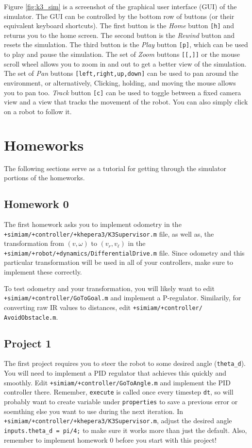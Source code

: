 \documentclass[10pt]{article}
\begin{document}
Figure \ref{fig:k3_sim} is a screenshot of the graphical user interface (GUI) of the simulator. The GUI can be controlled by the bottom row of buttons (or their equivalent keyboard shortcuts). The first button is the \textit{Home} button \texttt{[h]} and returns you to the home screen. The second button is the \textit{Rewind} button and resets the simulation. The third button is the \textit{Play} button \texttt{[p]}, which can be used to play and pause the simulation. The set of \textit{Zoom} buttons \texttt{[[,]]} or the mouse scroll wheel allows you to zoom in and out to get a better view of the simulation. The set of \textit{Pan} buttons \texttt{[left,right,up,down]} can be used to pan around the environment, or alternatively, Clicking, holding, and moving the mouse allows you to pan too. \textit{Track} button \texttt{[c]} can be used to toggle between a fixed camera view and a view that tracks the movement of the robot. You can also simply click on a robot to follow it.

\section*{Homeworks}

The following sections serve as a tutorial for getting through the simulator portions of the homeworks.

\subsection*{Homework 0}
The first homework asks you to implement odometry in the \texttt{+simiam/+controller/+khepera3/K3Supervisor.m} file, as well as, the transformation from $(v,\omega)$ to $(v_r,v_\ell)$ in the \texttt{+simiam/+robot/+dynamics/DifferentialDrive.m} file. Since odometry and this particular transformation will be used in all of your controllers, make sure to implement these correctly.

To test odometry and your transformation, you will likely want to edit \texttt{+simiam/+controller/GoToGoal.m} and implement a P-regulator. Similarily, for converting raw IR values to distances, edit \texttt{+simiam/+controller/}
\texttt{AvoidObstacle.m}.

\subsection*{Project 1}
The first project requires you to steer the robot to some desired angle (\texttt{theta\_d}). You will need to implement a PID regulator that achieves this quickly and smoothly. Edit \texttt{+simiam/+controller/GoToAngle.m} and implement the PID controller there. Remember, \texttt{execute} is called once every timestep \texttt{dt}, so will probably want to create variable under \texttt{properties} to save a previous error or soemthing else you want to use during the next iteration. In \texttt{+simiam/+controller/+khepera3/K3Supervisor.m}, adjust the desired angle \texttt{inputs.theta\_d = pi/4;} to make sure it works more than just the default. Also, remember to implement homework 0 before you start with this project!
\end{document}
